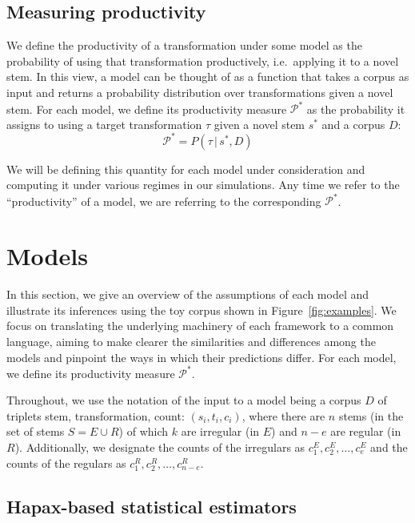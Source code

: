 \documentclass[
   11pt,
       ]{book}
\begin{document}
\hypertarget{measuring-productivity}{%
\subsection{Measuring productivity}\label{measuring-productivity}}

We define the productivity of a transformation under some model as the
probability of using that transformation productively, i.e.~applying it to a
novel stem. In this view, a model can be thought of as a function that takes a
corpus as input and returns a probability distribution over transformations
given a novel stem. For each model, we define its productivity measure
\(\mathcal{P}^*\) as the probability it assigns to using a target transformation
\(\tau\) given a novel stem \(s^*\) and a corpus \(D\):
\[\mathcal{P}^* = P(\tau\, |\, s^*,D)\]

We will be defining this quantity for each model under consideration and
computing it under various regimes in our simulations. Any time we refer to the
``productivity'' of a model, we are referring to the corresponding
\(\mathcal{P}^*\).

\hypertarget{models}{%
\section{Models}\label{models}}

In this section, we give an overview of the assumptions of each model and
illustrate its inferences using the toy corpus shown in
Figure~\ref{fig:examples}. We focus on translating the underlying machinery of
each framework to a common language, aiming to make clearer the similarities and
differences among the models and pinpoint the ways in which their predictions
differ. For each model, we define its productivity measure \(\mathcal{P}^*\).

Throughout, we use the notation of the input to a model being a corpus \(D\) of
triplets stem, transformation, count: \((s_i,t_i,c_i)\), where there are \(n\) stems
(in the set of stems \(S = E \cup R\)) of which \(k\) are irregular (in \(E\)) and
\(n-e\) are regular (in \(R\)). Additionally, we designate the counts of the
irregulars as \(c^E_1, c^E_2, \ldots, c^E_e\) and the counts of the regulars as
\(c^R_1, c^R_2, \ldots, c^R_{n-e}\).



\hypertarget{hapax-based-statistical-estimators}{%
\subsection{Hapax-based statistical estimators}\label{hapax-based-statistical-estimators}}
\end{document}
